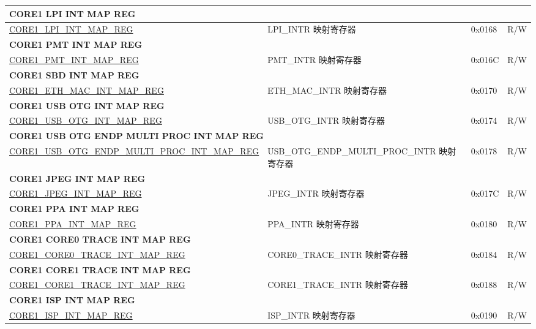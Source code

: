 \begin{longtable}{ | p{7.5cm} | p{7.2cm} | p{1.3cm} | p{1cm} | }
\multicolumn{4}{|l|}{\textbf{CORE1 LPI INT MAP REG}} \\ \hline
\hyperref[regdesc:CORE1LPIINTMAPREG]{CORE1\_LPI\_INT\_MAP\_REG} & LPI\_INTR 映射寄存器 & 0x0168 & R/W \\ \hline
\multicolumn{4}{|l|}{\textbf{CORE1 PMT INT MAP REG}} \\ \hline
\hyperref[regdesc:CORE1PMTINTMAPREG]{CORE1\_PMT\_INT\_MAP\_REG} & PMT\_INTR 映射寄存器 & 0x016C & R/W \\ \hline
\multicolumn{4}{|l|}{\textbf{CORE1 SBD INT MAP REG}} \\ \hline
\hyperref[regdesc:CORE1SBDINTMAPREG]{CORE1\_ETH\_MAC\_INT\_MAP\_REG} & ETH\_MAC\_INTR 映射寄存器 & 0x0170 & R/W \\ \hline
\multicolumn{4}{|l|}{\textbf{CORE1 USB OTG INT MAP REG}} \\ \hline
\hyperref[regdesc:CORE1USBOTGINTMAPREG]{CORE1\_USB\_OTG\_INT\_MAP\_REG} & USB\_OTG\_INTR 映射寄存器 & 0x0174 & R/W \\ \hline
\multicolumn{4}{|l|}{\textbf{CORE1 USB OTG ENDP MULTI PROC INT MAP REG}} \\ \hline
\hyperref[regdesc:CORE1USBOTGENDPMULTIPROCINTMAPREG]{CORE1\_USB\_OTG\_ENDP\_MULTI\_PROC\_INT\_MAP\_REG} & USB\_OTG\_ENDP\_MULTI\_PROC\_INTR 映射寄存器 & 0x0178 & R/W \\ \hline
\multicolumn{4}{|l|}{\textbf{CORE1 JPEG INT MAP REG}} \\ \hline
\hyperref[regdesc:CORE1JPEGINTMAPREG]{CORE1\_JPEG\_INT\_MAP\_REG} & JPEG\_INTR 映射寄存器 & 0x017C & R/W \\ \hline
\multicolumn{4}{|l|}{\textbf{CORE1 PPA INT MAP REG}} \\ \hline
\hyperref[regdesc:CORE1PPAINTMAPREG]{CORE1\_PPA\_INT\_MAP\_REG} & PPA\_INTR 映射寄存器 & 0x0180 & R/W \\ \hline
\multicolumn{4}{|l|}{\textbf{CORE1 CORE0 TRACE INT MAP REG}} \\ \hline
\hyperref[regdesc:CORE1CORE0TRACEINTMAPREG]{CORE1\_CORE0\_TRACE\_INT\_MAP\_REG} & CORE0\_TRACE\_INTR 映射寄存器 & 0x0184 & R/W \\ \hline
\multicolumn{4}{|l|}{\textbf{CORE1 CORE1 TRACE INT MAP REG}} \\ \hline
\hyperref[regdesc:CORE1CORE1TRACEINTMAPREG]{CORE1\_CORE1\_TRACE\_INT\_MAP\_REG} & CORE1\_TRACE\_INTR 映射寄存器 & 0x0188 & R/W \\ \hline
\multicolumn{4}{|l|}{\textbf{CORE1 ISP INT MAP REG}} \\ \hline
\hyperref[regdesc:CORE1ISPINTMAPREG]{CORE1\_ISP\_INT\_MAP\_REG} & ISP\_INTR 映射寄存器 & 0x0190 & R/W \\ \hline

\end{longtable}
